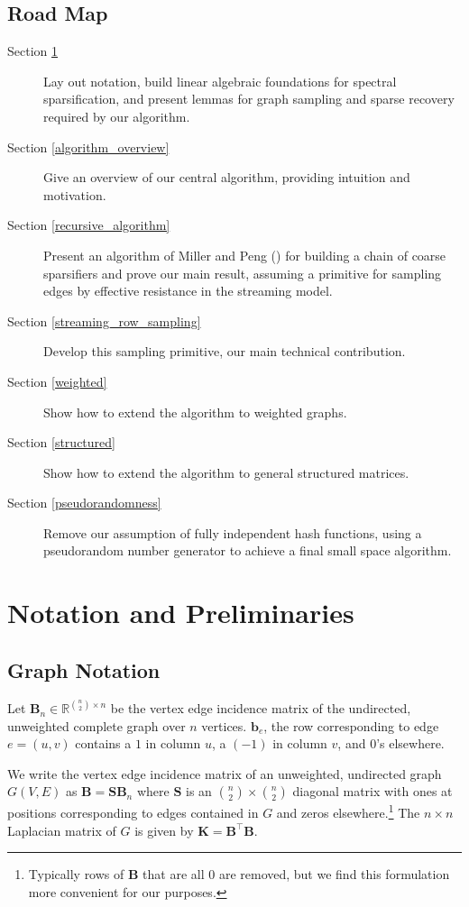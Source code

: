 \documentclass[11pt]{article}
\newcommand{\bv}[1]{\mathbf{#1}}
\begin{document}
\subsection{Road Map}
\begin{description}
\item[Section \ref{notation}] Lay out notation, build linear algebraic foundations for spectral sparsification, and present  lemmas for graph sampling and sparse recovery required by our algorithm.
\item[Section \ref{algorithm_overview}] Give an overview of our central algorithm, providing intuition and motivation.
\item[Section \ref{recursive_algorithm}] Present an algorithm of Miller and Peng (\cite{pengV1}) for building a chain of coarse sparsifiers and prove our main result, assuming a primitive for sampling edges by effective resistance in the streaming model.
\item[Section \ref{streaming_row_sampling}] Develop this sampling primitive, our main technical contribution.
\item[Section \ref{weighted}] Show how to extend the algorithm to weighted graphs.
\item[Section \ref{structured}] Show how to extend the algorithm to general structured matrices.
\item[Section \ref{pseudorandomness}] Remove our assumption of fully independent hash functions, using a pseudorandom number generator to achieve a final small space algorithm.
\end{description}
 \section{Notation and Preliminaries}\label{notation}

\subsection{Graph Notation}
Let $\bv{B}_n \in \mathbb{R}^{{n \choose 2} \times n}$ be the vertex edge incidence matrix of the undirected, unweighted complete graph over $n$ vertices. $\bv{b}_e$, the row corresponding to edge $e=(u,v)$ contains a $1$ in column $u$, a $(-1)$ in column $v$, and $0$'s elsewhere. 

We write the vertex edge incidence matrix of an unweighted, undirected graph $G(V,E)$ as $\bv{B} = \bv{S}\bv{B}_n$ where $\bv{S}$ is an ${n \choose 2} \times {n \choose 2}$ diagonal matrix with ones at positions corresponding to edges contained in $G$ and zeros elsewhere.\footnote{Typically rows of $\bv{B}$ that are all $0$ are removed, but we find this formulation more convenient for our purposes.}
The $n \times n$ Laplacian matrix of $G$ is given by  $\bv{K} =  \bv{B}^\top \bv{B}$. 
\end{document}
